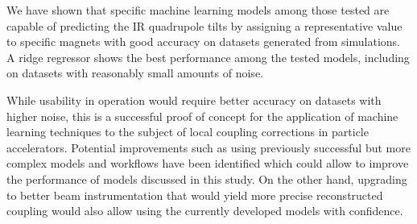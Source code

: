 We have shown that specific machine learning models among those tested are capable of predicting the IR quadrupole tilts by assigning a representative value to specific magnets with good accuracy on datasets generated from simulations.
A ridge regressor shows the best performance among the tested models, including on datasets with reasonably small amounts of noise.

While usability in operation would require better accuracy on datasets with higher noise, this is a successful proof of concept for the application of machine learning techniques to the subject of local coupling corrections in particle accelerators.
Potential improvements such as using previously successful but more complex models and workflows have been identified which could allow to improve the performance of models discussed in this study.
On the other hand, upgrading to better beam instrumentation that would yield more precise reconstructed coupling  would also allow using the currently developed models with confidence.

\glsresetall                                     %
